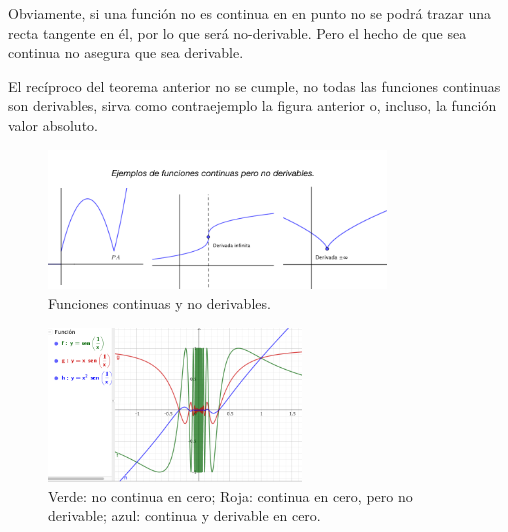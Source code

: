 	Obviamente, si una función no es continua en en punto no se podrá trazar una recta tangente en él, por lo que será no-derivable. Pero el hecho de que sea continua no asegura que sea derivable.
	
	El recíproco del teorema anterior no se cumple, no todas las funciones continuas son derivables, sirva como contraejemplo la figura anterior o, incluso, la función valor absoluto.
	
	
		\begin{figure}[H]
			\centering
			\includegraphics[width=0.8\textwidth]{imagenes/imagenes04/T04IM06.png}
			\caption{Funciones continuas y no derivables.}
		\end{figure}
		
		\begin{figure}[H]
			\centering
			\includegraphics[width=0.6\textwidth]{imagenes/imagenes04/T04IM08.png}
			\caption{Verde: no continua en cero; Roja: continua en cero, pero no derivable; azul: continua y derivable en cero.}
			\label{fig:ctndaddvbdad}
		\end{figure}
		
		
	

